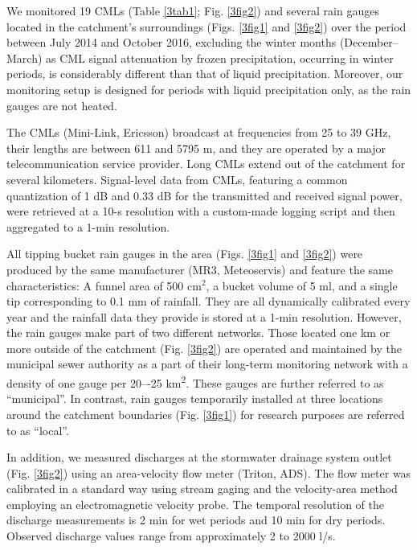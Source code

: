 \documentclass{ctuthesis}\usepackage[]{graphicx}\usepackage[]{color}
\begin{document}
We monitored 19 CMLs (Table \ref{3tab1}; Fig. \ref{3fig2}) and several rain gauges located in the catchment's surroundings (Figs. \ref{3fig1} and \ref{3fig2}) over the period between July 2014 and October 2016, excluding the winter months (December--March) as CML signal attenuation by frozen precipitation, occurring in winter periods, is considerably different than that of liquid precipitation. Moreover, our monitoring setup is designed for periods with liquid precipitation only, as the rain gauges are not heated.

The CMLs (Mini-Link, Ericsson) broadcast at frequencies from 25 to 39 GHz, their lengths are between 611 and 5795 m, and they are operated by a major telecommunication service provider. Long CMLs extend out of the catchment for several kilometers. Signal-level data from CMLs, featuring a common quantization of 1 dB and 0.33 dB for the transmitted and received signal power, were retrieved at a 10-s resolution with a custom-made logging script \citep{fenclCommercialMicrowaveLinks2015} and then aggregated to a 1-min resolution.

All tipping bucket rain gauges in the area (Figs. \ref{3fig1} and \ref{3fig2}) were produced by the same manufacturer (MR3, Meteoservis)  and feature the same characteristics:  A funnel area of 500 cm$^2$, a bucket volume of 5 ml, and a single tip corresponding to 0.1 mm of rainfall. They are all dynamically calibrated \citep{humphreyNewMethodAutomated1997} every year and the rainfall data they provide is stored at a 1-min resolution. However, the rain gauges make part of two different networks. Those located one km or more outside of the catchment (Fig. \ref{3fig2}) are operated and maintained by the municipal sewer authority as a part of their long-term monitoring network with a density of one gauge per 20–-25 km\textsuperscript{2}. These gauges are further referred to as \enquote{municipal}. In contrast, rain gauges temporarily installed at three locations around the catchment boundaries (Fig. \ref{3fig1}) for research purposes are referred to as \enquote{local}. 

In addition, we measured discharges at the stormwater drainage system outlet (Fig. \ref{3fig2}) using an area-velocity flow meter (Triton, ADS). The flow meter was calibrated in a standard way using stream gaging and the velocity-area method employing an electromagnetic velocity probe. The temporal resolution of the discharge measurements is 2 min for wet periods and 10 min for dry periods. Observed discharge values range from approximately 2 to 2000 l/s.
\end{document}
